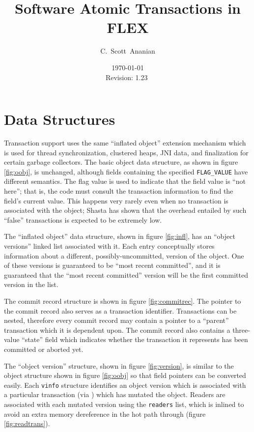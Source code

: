 \documentclass[11pt,notitlepage]{article}
\author{C.~Scott~Ananian}
\title{Software Atomic Transactions in FLEX}
\date{\today \\ $ $Revision: 1.23 $ $}
\begin{document}

\maketitle
\section{Data Structures}

Transaction support uses the same ``inflated object'' extension
mechanism which is used for thread synchronization, clustered heaps,
JNI data, and finalization for certain garbage collectors.
The basic object data structure, as shown in figure \ref{fig:oobj}, is
unchanged, although fields containing the specified
\texttt{FLAG\_VALUE} have different semantics.  The flag value is used
to indicate that the field value is ``not here''; that is, the code
must consult the transaction information to find the field's current
value.  This happens very rarely even when no transaction is
associated with the object; Shasta \cite{scales96:shasta} has shown that the
overhead entailed by such ``false'' transactions is expected to be
extremely low.

The ``inflated object'' data structure, shown in figure
\ref{fig:infl}, has an ``object versions'' linked list associated with
it.  Each entry conceptually stores information about a different,
possibly-uncommitted, version of the object.  One of these versions is
guaranteed to be ``most recent committed'', and it is guaranteed that
the ``most recent committed'' version will be the first committed
version in the list.

The commit record structure is shown in figure \ref{fig:commitrec}.
The pointer to the commit record also serves as a transaction
identifier.  Transactions can be nested, therefore every commit record
may contain a pointer to a ``parent'' transaction which it is
dependent upon.  The commit record also contains a three-value
``state'' field which indicates whether the transaction it represents
has been committed or aborted yet.

The ``object version'' structure, shown in figure
\ref{fig:version}, is similar to the object structure shown in
figure \ref{fig:oobj} so that field pointers can be converted easily.
Each \texttt{vinfo} structure identifies an object version which is
associated with a particular transaction (via ) which
has mutated the object.  Readers are associated with each mutated
version using the \texttt{readers} list, which is inlined to avoid an
extra memory dereference in the hot path through 
(figure \ref{fig:readtrans}).
\end{document}
